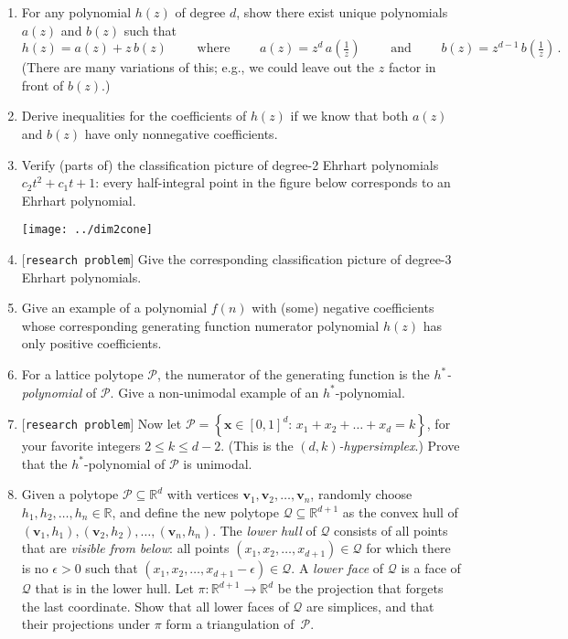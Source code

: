 \documentclass[11pt]{article}
\def\bv{\mathbf{v}}
\def\bx{\mathbf{x}}
\def\cP{\mathcal{P}}
\def\cQ{\mathcal{Q}}
\def\RR{\mathbb{R}}
\def\open{$[${\tt research problem}$]$ }
\begin{document}
\begin{enumerate}[(1)]
\vspace{-10pt}

\item For any polynomial $h(z)$ of degree $d$, show there exist unique polynomials $a(z)$ and $b(z)$ such that
\[
  h(z) = a(z) + z \, b(z)
  \qquad \text{ where } \qquad a(z) = z^d \, a(\tfrac 1 z) \qquad \text{ and } \qquad b(z) = z^{ d-1 } \, b(\tfrac 1 z) \, .
\]
(There are many variations of this; e.g., we could leave out the $z$ factor in front of $b(z)$.)

\item Derive inequalities for the coefficients of $h(z)$ if we know that both $a(z)$ and $b(z)$ have only nonnegative
coefficients.

\item Verify (parts of) the classification picture of degree-2 Ehrhart polynomials $c_2 t^2 + c_1 t + 1$: every
half-integral point in the figure below corresponds to an Ehrhart polynomial.

\begin{center}
\texttt{[image: ../dim2cone]}
\end{center}

\item \open Give the corresponding classification picture of degree-3 Ehrhart polynomials. 
 
\item Give an example of a polynomial $f(n)$ with (some) negative coefficients whose corresponding generating function
numerator polynomial $h(z)$ has only positive coefficients.

\item For a lattice polytope $\cP$, the numerator of the generating function is the \emph{$h^*$-polynomial} of $\cP$.
Give a non-unimodal example of an $h^*$-polynomial.

\item \open
Now let
$\cP = \left\{ \bx \in [0,1]^d : \, x_1 + x_2 + \dots + x_d = k \right\}$,
for your favorite integers $2 \le k \le d-2$. 
(This is the \emph{$(d, k)$-hypersimplex}.)
Prove that the $h^*$-polynomial of $\cP$ is unimodal.
 
\item Given a polytope $\cP \subseteq \RR^d$ with vertices $\bv_1, \bv_2, \dots, \bv_n$, randomly choose $h_1, h_2,
\dots, h_n \in \RR$, and define the new polytope $\cQ \subseteq \RR^{ d+1 }$ as the convex hull of
$(\bv_1, h_1), (\bv_2, h_2), \dots, (\bv_n, h_n)$.
The \emph{lower hull} of $\cQ$ consists of all points that are \emph{visible from below}: all points $(x_1, x_2, \dots, x_{ d+1 }) \in \cQ$ for which there is no $\epsilon > 0$ such that $(x_1, x_2, \dots, x_{ d+1 } - \epsilon) \in \cQ$.
A \emph{lower face} of $\cQ$ is a face of $\cQ$ that is in the lower hull.
Let $\pi : \RR^{ d+1 } \to \RR^d$ be the projection that forgets the last coordinate. 
Show that all lower faces of $\cQ$ are simplices, and that their projections under $\pi$ form a triangulation of~$\cP$.

\end{enumerate}
\end{document}
